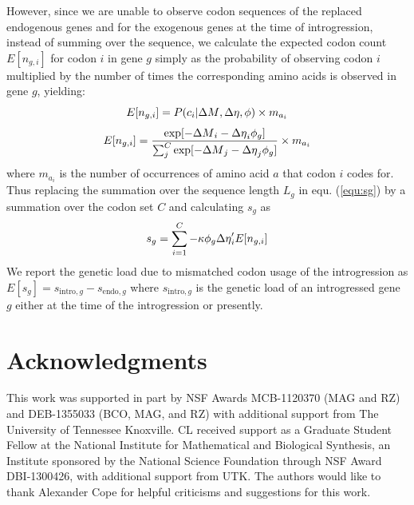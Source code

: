 \documentclass[fleqn,letterpaper]{article}
\newcommand\suppl{\par
  \setcounter{section}{0}%
  \setcounter{subsection}{0}%
  \setcounter{table}{0}%
  \setcounter{figure}{0}%
  \setcounter{equation}{0}%
  \gdef\thesection{\Alph{section}.1}%
  \def\thefigure{\Alph{section}\arabic{figure}}%
  \def\thetable{\Alph{section}\arabic{table}}%
  \def\theequation {\Alph{section}\arabic{equation}}}
\begin{document}
However, since we are unable to observe codon sequences of the replaced endogenous genes and for the exogenous genes at the time of introgression, instead of summing over the sequence, we calculate the expected codon count $E[n_{g,i}] $ for codon $i$ in gene $g$ simply as the probability of observing codon $i$ multiplied by the number of times the corresponding amino acids is observed in gene $g$, yielding:
\begin{equation}
E[n_{g,i}] = P(c_i | {\Delta M}, {\Delta \eta}, \phi) \times m_{a_i}
\end{equation}
\begin{equation}
E[n_{g,i}] = \frac{\exp[-{\Delta M}_i -{\Delta \eta}_i\phi_g]}{\sum_j^C \exp[-{\Delta M}_j -{\Delta \eta}_j\phi_g]}\times m_{a_i}
\end{equation} 
where $m_{a_i}$ is the number of occurrences of amino acid $a$ that codon $i$ codes for.
Thus replacing the summation over the sequence length $L_g$ in equ. (\ref{equ:sg}) by a summation over the codon set $C$ and calculating $s_g$ as
\begin{equation}
s_g = \sum_{i=1}^{C} -\kappa \phi_g {\Delta \eta}'_i E[n_{g,i}] 
\end{equation}
We report the genetic load due to mismatched codon usage of the introgression as $E[s_g] = s_{\text{intro},g} - s_{\text{endo},g}$ where $s_{\text{intro},g}$ is the genetic load of an introgressed gene $g$ either at the time of the introgression or presently.

\section*{Acknowledgments}

This work was supported in part by NSF Awards MCB-1120370 (MAG and RZ) and DEB-1355033 (BCO, MAG, and RZ) with additional support from The University of Tennessee Knoxville. 
CL received support as a Graduate Student Fellow at the National Institute for Mathematical and Biological Synthesis, an Institute sponsored by the National Science Foundation through NSF Award DBI-1300426, with additional support from UTK. 
The authors would like to thank Alexander Cope for helpful criticisms and suggestions for this work.






\clearpage
\pagebreak



\suppl

\setcounter{section}{19} %
\setcounter{page}{1}
\renewcommand{\thepage}{S\arabic{page}} %
\end{document}

